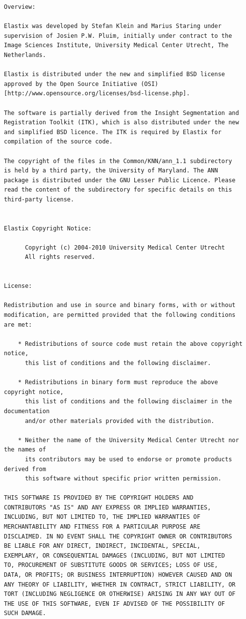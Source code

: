 \documentclass[]{report}
\begin{document}
\small
\begin{verbatim}
Overview:

Elastix was developed by Stefan Klein and Marius Staring under
supervision of Josien P.W. Pluim, initially under contract to the
Image Sciences Institute, University Medical Center Utrecht, The
Netherlands.

Elastix is distributed under the new and simplified BSD license
approved by the Open Source Initiative (OSI)
[http://www.opensource.org/licenses/bsd-license.php].

The software is partially derived from the Insight Segmentation and
Registration Toolkit (ITK), which is also distributed under the new
and simplified BSD licence. The ITK is required by Elastix for
compilation of the source code.

The copyright of the files in the Common/KNN/ann_1.1 subdirectory
is held by a third party, the University of Maryland. The ANN
package is distributed under the GNU Lesser Public Licence. Please
read the content of the subdirectory for specific details on this
third-party license.


Elastix Copyright Notice:

      Copyright (c) 2004-2010 University Medical Center Utrecht
      All rights reserved.


License:

Redistribution and use in source and binary forms, with or without
modification, are permitted provided that the following conditions
are met:

    * Redistributions of source code must retain the above copyright notice,
      this list of conditions and the following disclaimer.

    * Redistributions in binary form must reproduce the above copyright notice,
      this list of conditions and the following disclaimer in the documentation
      and/or other materials provided with the distribution.

    * Neither the name of the University Medical Center Utrecht nor the names of
      its contributors may be used to endorse or promote products derived from
      this software without specific prior written permission.

THIS SOFTWARE IS PROVIDED BY THE COPYRIGHT HOLDERS AND
CONTRIBUTORS "AS IS" AND ANY EXPRESS OR IMPLIED WARRANTIES,
INCLUDING, BUT NOT LIMITED TO, THE IMPLIED WARRANTIES OF
MERCHANTABILITY AND FITNESS FOR A PARTICULAR PURPOSE ARE
DISCLAIMED. IN NO EVENT SHALL THE COPYRIGHT OWNER OR CONTRIBUTORS
BE LIABLE FOR ANY DIRECT, INDIRECT, INCIDENTAL, SPECIAL,
EXEMPLARY, OR CONSEQUENTIAL DAMAGES (INCLUDING, BUT NOT LIMITED
TO, PROCUREMENT OF SUBSTITUTE GOODS OR SERVICES; LOSS OF USE,
DATA, OR PROFITS; OR BUSINESS INTERRUPTION) HOWEVER CAUSED AND ON
ANY THEORY OF LIABILITY, WHETHER IN CONTRACT, STRICT LIABILITY, OR
TORT (INCLUDING NEGLIGENCE OR OTHERWISE) ARISING IN ANY WAY OUT OF
THE USE OF THIS SOFTWARE, EVEN IF ADVISED OF THE POSSIBILITY OF
SUCH DAMAGE.
\end{verbatim}
\normalsize


\newpage
\pagestyle{plain} 


\end{document}
